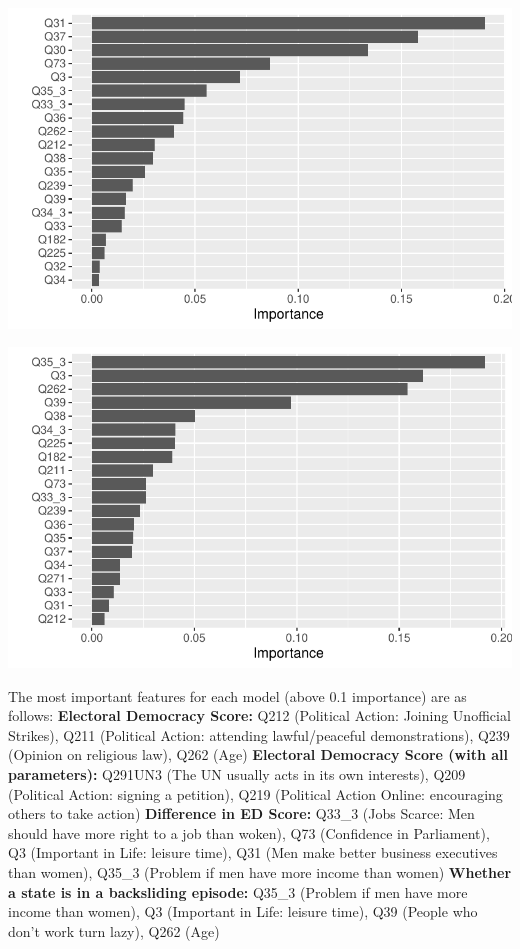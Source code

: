 \documentclass[
  letterpaper,
  DIV=11,
  numbers=noendperiod]{scrartcl}
\begin{document}
\includegraphics{Episode_2_files/figure-pdf/vip-3.pdf}

\includegraphics{Episode_2_files/figure-pdf/vip-4.pdf}

The most important features for each model (above 0.1 importance) are as
follows: \textbf{Electoral Democracy Score:} Q212 (Political Action:
Joining Unofficial Strikes), Q211 (Political Action: attending
lawful/peaceful demonstrations), Q239 (Opinion on religious law), Q262
(Age) \textbf{Electoral Democracy Score (with all parameters):} Q291UN3
(The UN usually acts in its own interests), Q209 (Political Action:
signing a petition), Q219 (Political Action Online: encouraging others
to take action) \textbf{Difference in ED Score:} Q33\_3 (Jobs Scarce:
Men should have more right to a job than woken), Q73 (Confidence in
Parliament), Q3 (Important in Life: leisure time), Q31 (Men make better
business executives than women), Q35\_3 (Problem if men have more income
than women) \textbf{Whether a state is in a backsliding episode:} Q35\_3
(Problem if men have more income than women), Q3 (Important in Life:
leisure time), Q39 (People who don't work turn lazy), Q262 (Age)
\end{document}
